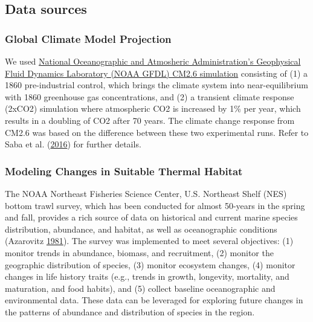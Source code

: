 \documentclass[
]{book}
\begin{document}
\hypertarget{data-sources-41}{%
\subsection{Data sources}\label{data-sources-41}}

\hypertarget{global-climate-model-projection}{%
\subsubsection{Global Climate Model Projection}\label{global-climate-model-projection}}

We used \href{https://www.gfdl.noaa.gov/high-resolution-climate-modeling/}{National Oceanographic and Atmosheric Administration's Geophysical Fluid Dynamics Laboratory (NOAA GFDL) CM2.6 simulation} consisting of (1) a 1860 pre-industrial control, which brings the climate system into near-equilibrium with 1860 greenhouse gas concentrations, and (2) a transient climate response (2xCO2) simulation where atmospheric CO2 is increased by 1\% per year, which results in a doubling of CO2 after 70 years. The climate change response from CM2.6 was based on the difference between these two experimental runs. Refer to Saba et al. (\protect\hyperlink{ref-Saba2016}{2016}) for further details.

\hypertarget{modeling-changes-in-suitable-thermal-habitat}{%
\subsubsection{Modeling Changes in Suitable Thermal Habitat}\label{modeling-changes-in-suitable-thermal-habitat}}

The NOAA Northeast Fisheries Science Center, U.S. Northeast Shelf (NES) bottom trawl survey, which has been conducted for almost 50-years in the spring and fall, provides a rich source of data on historical and current marine species distribution, abundance, and habitat, as well as oceanographic conditions (Azarovitz \protect\hyperlink{ref-Azarovitz1981}{1981}). The survey was implemented to meet several objectives: (1) monitor trends in abundance, biomass, and recruitment, (2) monitor the geographic distribution of species, (3) monitor ecosystem changes, (4) monitor changes in life history traits (e.g., trends in growth, longevity, mortality, and maturation, and food habits), and (5) collect baseline oceanographic and environmental data. These data can be leveraged for exploring future changes in the patterns of abundance and distribution of species in the region.
\end{document}
